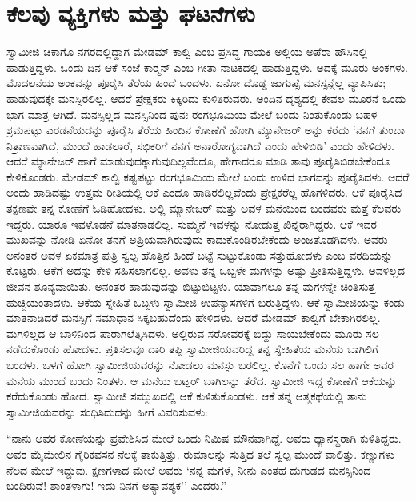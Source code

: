 
\chapter{ಕೆಲವು ವ್ಯಕ್ತಿಗಳು ಮತ್ತು ಘಟನೆಗಳು }

 ಸ್ವಾಮೀಜಿ ಚಿಕಾಗೊ ನಗರದಲ್ಲಿದ್ದಾಗ ಮೇಡಮ್ ಕಾಲ್ವಿ ಎಂಬ ಪ್ರಸಿದ್ಧ ಗಾಯಕಿ ಅಲ್ಲಿಯ ಅಪೆರಾ ಹೌಸಿನಲ್ಲಿ ಹಾಡುತ್ತಿದ್ದಳು. ಒಂದು ದಿನ ಆಕೆ ಸಂಜೆ ಕಾರ್‍ಮನ್ ಎಂಬ ಗೀತಾ ನಾಟಕದಲ್ಲಿ ಹಾಡುತ್ತಿದ್ದಳು. ಅದಕ್ಕೆ ಮೂರು ಅಂಕಗಳು. ಮೊದಲನೆಯ ಅಂಕವನ್ನು ಪೂರೈಸಿ ತೆರೆಯ ಹಿಂದೆ ಬಂದಳು. ಏನೋ ದೊಡ್ಡ ಜುಗುಪ್ಸೆ ಮನಸ್ಸನ್ನೆಲ್ಲ ವ್ಯಾಪಿಸಿತು; ಹಾಡುವುದಕ್ಕೇ ಮನಸ್ಸಿರಲಿಲ್ಲ. ಆದರೆ ಪ್ರೇಕ್ಷಕರು ಕಿಕ್ಕಿರಿದು ಕುಳಿತಿರುವರು. ಅಂದಿನ ದೃಶ್ಯದಲ್ಲಿ ಕೇವಲ ಮೂರನೆ ಒಂದು ಭಾಗ ಮಾತ್ರ ಆಗಿದೆ. ಮನಸ್ಸಿಲ್ಲದ ಮನಸ್ಸಿನಿಂದ ಪುನಃ ರಂಗಭೂಮಿಯ ಮೇಲೆ ಬಂದು ನಿಂತುಕೊಂಡು ಬಹಳ ಶ್ರಮಪಟ್ಟು ಎರಡನೆಯದನ್ನು ಪೂರೈಸಿ ತೆರೆಯ ಹಿಂದಿನ ಕೋಣೆಗೆ ಹೋಗಿ ಮ್ಯಾನೇಜರ್ ಅನ್ನು ಕರೆದು ‘ನನಗೆ ತುಂಬಾ ನಿತ್ರಾಣವಾಗಿದೆ, ಮುಂದೆ ಹಾಡಲಾರೆ, ಸಭಿಕರಿಗೆ ನನಗೆ ಅನಾರೋಗ್ಯವಾಗಿದೆ ಎಂದು ಹೇಳಿಬಿಡಿ’ ಎಂದು ಹೇಳಿದಳು. ಆದರೆ ಮ್ಯಾನೇಜರ್ ಹಾಗೆ ಮಾಡುವುದಕ್ಕಾಗುವುದಿಲ್ಲವೆಂದೂ, ಹೇಗಾದರೂ ಮಾಡಿ ತಾವು ಪೂರೈಸಿಬಿಡಬೇಕೆಂದೂ ಕೇಳಿಕೊಂಡರು. ಮೇಡಮ್ ಕಾಲ್ವಿ ಕಷ್ಟಪಟ್ಟು ರಂಗಭೂಮಿಯ ಮೇಲೆ ಬಂದು ಉಳಿದ ಭಾಗವನ್ನು ಪೂರೈಸಿದಳು. ಆದರೆ ಅಂದು ಹಾಡಿದಷ್ಟು ಉತ್ತಮ ರೀತಿಯಲ್ಲಿ ಆಕೆ ಎಂದೂ ಹಾಡಿರಲಿಲ್ಲವೆಂದು ಪ್ರೇಕ್ಷಕರೆಲ್ಲ ಹೊಗಳಿದರು. ಆಕೆ ಪೂರೈಸಿದ ತಕ್ಷಣವೇ ತನ್ನ ಕೋಣೆಗೆ ಓಡಿಹೋದಳು. ಅಲ್ಲಿ ಮ್ಯಾನೇಜರ್ ಮತ್ತು ಅವಳ ಮನೆಯಿಂದ ಬಂದವರು ಮತ್ತೆ ಕೆಲವರು ಇದ್ದರು. ಯಾರೂ ಇವಳೊಡನೆ ಮಾತನಾಡಲಿಲ್ಲ. ಸುಮ್ಮನೆ ಇವಳನ್ನು ನೋಡುತ್ತ ಖಿನ್ನರಾಗಿದ್ದರು. ಆಕೆ ಇವರ ಮುಖವನ್ನು ನೋಡಿ ಏನೋ ತನಗೆ ಅಪ್ರಿಯವಾಗಿರುವುದು ಕಾದುಕೊಂಡಿರಬೇಕೆಂದು ಅಂಜತೊಡಗಿದಳು. ಅವರು ಅನಂತರ ಅವಳ ಏಕಮಾತ್ರ ಪುತ್ರಿ ಸ್ವಲ್ಪ ಹೊತ್ತಿನ ಹಿಂದೆ ಬಟ್ಟೆ ಸುಟ್ಟುಕೊಂಡು ಸತ್ತುಹೋದಳು ಎಂಬ ವರದಿಯನ್ನು ಕೊಟ್ಟರು. ಆಕೆಗೆ ಅದನ್ನು ಕೇಳಿ ಸಹಿಸಲಾಗಲಿಲ್ಲ. ಅವಳು ತನ್ನ ಒಬ್ಬಳೇ ಮಗಳನ್ನು ಅಷ್ಟು ಪ್ರೀತಿಸುತ್ತಿದ್ದಳು. ಅವಳಿಲ್ಲದ ಜೀವನ ಶೂನ್ಯವಾಯಿತು. ಅನಂತರ ಹಾಡುವುದನ್ನು ಬಿಟ್ಟುಬಿಟ್ಟಳು. ಯಾವಾಗಲೂ ತನ್ನ ಮಗಳನ್ನೇ ಚಿಂತಿಸುತ್ತ ಹುಚ್ಚಿಯಂತಾದಳು. ಆಕೆಯ ಸ್ನೇಹಿತೆ ಒಬ್ಬಳು ಸ್ವಾಮೀಜಿ ಉಪನ್ಯಾಸಗಳಿಗೆ ಬರುತ್ತಿದ್ದಳು. ಆಕೆ ಸ್ವಾಮೀಜಿಯನ್ನು ಕಂಡು ಮಾತನಾಡಿದರೆ ಮನಸ್ಸಿಗೆ ಸಮಾಧಾನ ಸಿಕ್ಕಬಹುದೆಂದು ಹೇಳಿದಳು. ಆದರೆ ಮೇಡಮ್ ಕಾಲ್ವಿಗೆ ಬೇಕಾಗಿರಲಿಲ್ಲ. ಮಗಳಿಲ್ಲದ ಆ ಬಾಳಿನಿಂದ ಪಾರಾಗಲೆತ್ನಿಸಿದಳು. ಅಲ್ಲಿರುವ ಸರೋವರಕ್ಕೆ ಬಿದ್ದು ಸಾಯಬೇಕೆಂದು ಮೂರು ಸಲ ನಡೆದುಕೊಂಡು ಹೋದಳು. ಪ್ರತಿಸಲವೂ ದಾರಿ ತಪ್ಪಿ ಸ್ವಾಮೀಜಿಯವರಿದ್ದ ತನ್ನ ಸ್ನೇಹಿತೆಯ ಮನೆಯ ಬಾಗಿಲಿಗೆ ಬಂದಳು. ಒಳಗೆ ಹೋಗಿ ಸ್ವಾಮೀಜಿಯವರನ್ನು ನೋಡಲು ಮನಸ್ಸು ಬರಲಿಲ್ಲ. ಕೊನೆಗೆ ಒಂದು ಸಲ ಹಾಗೇ ಅವರ ಮನೆಯ ಮುಂದೆ ಬಂದು ನಿಂತಳು. ಆ ಮನೆಯ ಬಟ್ಲರ್ ಬಾಗಿಲನ್ನು ತೆರೆದ. ಸ್ವಾಮೀಜಿ ಇದ್ದ ಕೋಣೆಗೆ ಆಕೆಯನ್ನು ಕರೆದುಕೊಂಡು ಹೋದ. ಸ್ವಾಮೀಜಿ ಸಮ್ಮುಖದಲ್ಲಿ ಆಕೆ ಕುಳಿತುಕೊಂಡಳು. ಆಕೆ ತನ್ನ ಆತ್ಮಕಥೆಯಲ್ಲಿ ತಾನು ಸ್ವಾಮೀಜಿಯವರನ್ನು ಸಂಧಿಸಿದುದನ್ನು ಹೀಗೆ ವಿವರಿಸುವಳು: 

 “ನಾನು ಅವರ ಕೋಣೆಯನ್ನು ಪ್ರವೇಶಿಸಿದ ಮೇಲೆ ಒಂದು ನಿಮಿಷ ಮೌನವಾಗಿದ್ದೆ. ಅವರು ಧ್ಯಾನಸ್ಥರಾಗಿ ಕುಳಿತಿದ್ದರು. ಅವರ ಮೈಮೇಲಿನ ಗೈರಿಕವಸನ ನೆಲಕ್ಕೆ ತಾಕುತ್ತಿತ್ತು. ರುಮಾಲನ್ನು ಸುತ್ತಿದ ತಲೆ ಸ್ವಲ್ಪ ಮುಂದೆ ವಾಲಿತ್ತು. ಕಣ್ಣುಗಳು ನೆಲದ ಮೇಲೆ ಇದ್ದುವು. ಕ್ಷಣಗಳಾದ ಮೇಲೆ ಅವರು ‘ನನ್ನ ಮಗಳೆ, ನೀನು ಎಂತಹ ದುಗುಡದ ಮನಸ್ಸಿನಿಂದ ಬಂದಿರುವೆ! ಶಾಂತಳಾಗು! ಇದು ನಿನಗೆ ಅತ್ಯಾವಶ್ಯಕ'’ ಎಂದರು.” 


